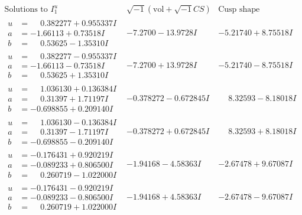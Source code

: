 \documentclass[1p]{elsarticle_modified}
\theoremstyle{definition}
\newcommand{\I}{\sqrt{-1}}
\begin{document}
$$\begin{array}{c|c|c}  
\text{Solutions to }I^u_{1}& \I (\text{vol} + \sqrt{-1}CS) & \text{Cusp shape}\\
 \hline 
\begin{aligned}
u &= \phantom{-}0.382277 + 0.955337 I \\
a &= -1.66113 + 0.73518 I \\
b &= \phantom{-}0.53625 - 1.35310 I\end{aligned}
 & -7.2700 - 13.9728 I & -5.21740 + 8.75518 I \\ \hline\begin{aligned}
u &= \phantom{-}0.382277 - 0.955337 I \\
a &= -1.66113 - 0.73518 I \\
b &= \phantom{-}0.53625 + 1.35310 I\end{aligned}
 & -7.2700 + 13.9728 I & -5.21740 - 8.75518 I \\ \hline\begin{aligned}
u &= \phantom{-}1.036130 + 0.136384 I \\
a &= \phantom{-}0.31397 + 1.71197 I \\
b &= -0.698855 + 0.209140 I\end{aligned}
 & -0.378272 - 0.672845 I & \phantom{-}8.32593 - 8.18018 I \\ \hline\begin{aligned}
u &= \phantom{-}1.036130 - 0.136384 I \\
a &= \phantom{-}0.31397 - 1.71197 I \\
b &= -0.698855 - 0.209140 I\end{aligned}
 & -0.378272 + 0.672845 I & \phantom{-}8.32593 + 8.18018 I \\ \hline\begin{aligned}
u &= -0.176431 + 0.920219 I \\
a &= -0.089233 + 0.806500 I \\
b &= \phantom{-}0.260719 - 1.022000 I\end{aligned}
 & -1.94168 - 4.58363 I & -2.67478 + 9.67087 I \\ \hline\begin{aligned}
u &= -0.176431 - 0.920219 I \\
a &= -0.089233 - 0.806500 I \\
b &= \phantom{-}0.260719 + 1.022000 I\end{aligned}
 & -1.94168 + 4.58363 I & -2.67478 - 9.67087 I \\ \hline\begin{aligned}

\end{aligned}
\end{array}$$
\end{document}
